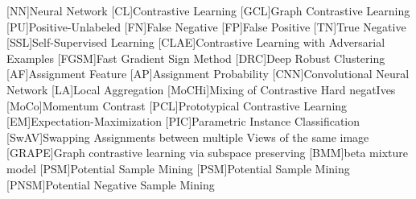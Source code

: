 \begin{acronym}

    [NN]{Neural Network}
    [CL]{Contrastive Learning}
    [GCL]{Graph Contrastive Learning}
    [PU]{Positive-Unlabeled}
    [FN]{False Negative}
    [FP]{False Positive}
    [TN]{True Negative}
    [SSL]{Self-Supervised Learning}
    [CLAE]{Contrastive Learning with Adversarial Examples}
    [FGSM]{Fast Gradient Sign Method}
    [DRC]{Deep Robust Clustering}
    [AF]{Assignment Feature}
    [AP]{Assignment Probability}
    [CNN]{Convolutional Neural Network}
    [LA]{Local Aggregation}
    [MoCHi]{Mixing of Contrastive Hard negatIves}
    [MoCo]{Momentum Contrast}
    [PCL]{Prototypical Contrastive Learning}
    [EM]{Expectation-Maximization}
    [PIC]{Parametric Instance Classification}
    [SwAV]{Swapping Assignments between multiple Views of the same image}
    [GRAPE]{Graph contrastive learning via subspace preserving}
    [BMM]{beta mixture model}
    [PSM]{Potential Sample Mining}
    [PSM]{Potential Sample Mining}
    [PNSM]{Potential Negative Sample Mining}


\end{acronym}